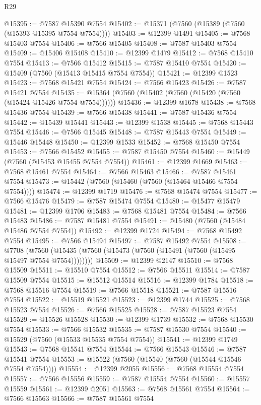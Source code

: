 \begin{lexlean}{R29}
\begin{coremodule}
@15395 := @7587 @15390 @7554
@15402 := @15371 (@7560 (@15389 (@7560 (@15393 @15395 @7554 @7554))))
@15403 := @12399 @1491
@15405 := @7568 @15403 @7554
@15406 := @7566 @15405
@15408 := @7587 @15403 @7554
@15409 := @15406 @15408
@15410 := @12399 @1479
@15412 := @7568 @15410 @7554
@15413 := @7566 @15412
@15415 := @7587 @15410 @7554
@15420 := @15409 (@7560 (@15413 @15415 @7554 @7554))
@15421 := @12399 @1523
@15423 := @7568 @15421 @7554
@15424 := @7566 @15423
@15426 := @7587 @15421 @7554
@15435 := @15364 (@7560 (@15402 (@7560 (@15420 (@7560 (@15424 @15426 @7554 @7554))))))
@15436 := @12399 @1678
@15438 := @7568 @15436 @7554
@15439 := @7566 @15438
@15441 := @7587 @15436 @7554
@15442 := @15439 @15441
@15443 := @12399 @1538
@15445 := @7568 @15443 @7554
@15446 := @7566 @15445
@15448 := @7587 @15443 @7554
@15449 := @15446 @15448
@15450 := @12399 @1533
@15452 := @7568 @15450 @7554
@15453 := @7566 @15452
@15455 := @7587 @15450 @7554
@15460 := @15449 (@7560 (@15453 @15455 @7554 @7554))
@15461 := @12399 @1669
@15463 := @7568 @15461 @7554
@15464 := @7566 @15463
@15466 := @7587 @15461 @7554
@15473 := @15442 (@7560 (@15460 (@7560 (@15464 @15466 @7554 @7554))))
@15474 := @12399 @1719
@15476 := @7568 @15474 @7554
@15477 := @7566 @15476
@15479 := @7587 @15474 @7554
@15480 := @15477 @15479
@15481 := @12399 @1706
@15483 := @7568 @15481 @7554
@15484 := @7566 @15483
@15486 := @7587 @15481 @7554
@15491 := @15480 (@7560 (@15484 @15486 @7554 @7554))
@15492 := @12399 @1724
@15494 := @7568 @15492 @7554
@15495 := @7566 @15494
@15497 := @7587 @15492 @7554
@15508 := @7708
    (@7560 (@15435 (@7560 (@15473 (@7560 (@15491 (@7560 (@15495 @15497 @7554 @7554))))))))
@15509 := @12399 @2147
@15510 := @7568 @15509
@15511 := @15510 @7554
@15512 := @7566 @15511
@15514 := @7587 @15509 @7554
@15515 := @15512 @15514
@15516 := @12399 @1784
@15518 := @7568 @15516 @7554
@15519 := @7566 @15518
@15521 := @7587 @15516 @7554
@15522 := @15519 @15521
@15523 := @12399 @1744
@15525 := @7568 @15523 @7554
@15526 := @7566 @15525
@15528 := @7587 @15523 @7554
@15529 := @15526 @15528
@15530 := @12399 @1739
@15532 := @7568 @15530 @7554
@15533 := @7566 @15532
@15535 := @7587 @15530 @7554
@15540 := @15529 (@7560 (@15533 @15535 @7554 @7554))
@15541 := @12399 @1749
@15543 := @7568 @15541 @7554
@15544 := @7566 @15543
@15546 := @7587 @15541 @7554
@15553 := @15522 (@7560 (@15540 (@7560 (@15544 @15546 @7554 @7554))))
@15554 := @12399 @2055
@15556 := @7568 @15554 @7554
@15557 := @7566 @15556
@15559 := @7587 @15554 @7554
@15560 := @15557 @15559
@15561 := @12399 @2051
@15563 := @7568 @15561 @7554
@15564 := @7566 @15563
@15566 := @7587 @15561 @7554

\end{coremodule}
\end{lexlean}
